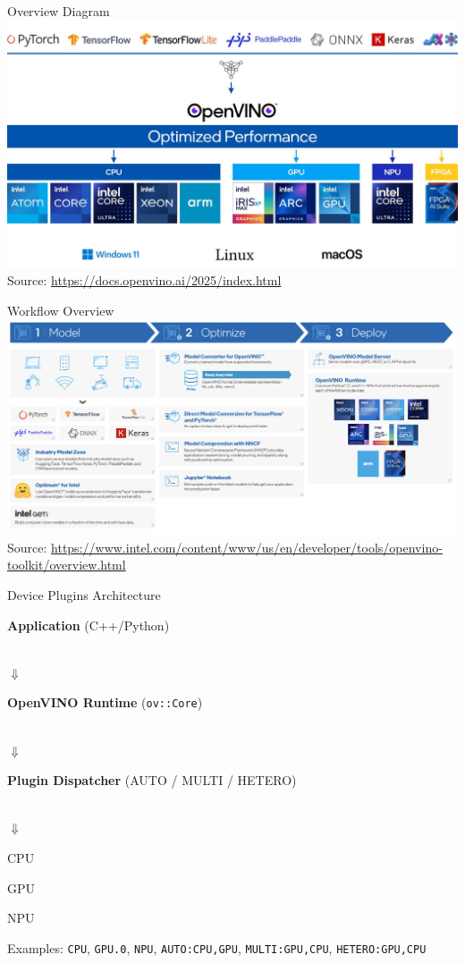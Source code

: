\documentclass{beamer}
\newcommand{\ovbox}[2]{\colorbox{#1}{\strut\parbox[c][1.2em]{0.6\linewidth}{\centering #2}}}
\newcommand{\ovpbox}[2]{\colorbox{#1}{\strut\parbox[c][1.2em]{0.15\linewidth}{\centering #2}}}
\begin{document}
\begin{frame}{Overview Diagram}
  \centering
  \includegraphics[width=\textwidth]{openvino-overview-diagram.jpg}
  \footnotesize Source: \href{https://docs.openvino.ai/2025/_images/openvino-overview-diagram.jpg}{https://docs.openvino.ai/2025/index.html}
\end{frame}

\begin{frame}{Workflow Overview}
  \centering
  \includegraphics[width=\textwidth]{openvino-use-case.png}
  \footnotesize Source: \href{https://www.intel.com/content/www/us/en/developer/tools/openvino-toolkit/overview.html}{https://www.intel.com/content/www/us/en/developer/tools/openvino-toolkit/overview.html}
\end{frame}

\begin{frame}{Device Plugins Architecture}
  \centering
  \ovbox{gray!15}{\textbf{Application} (C++/Python)}\\[0.6em]
  $\Downarrow$\\[0.2em]
  \ovbox{gray!15}{\textbf{OpenVINO Runtime} (\texttt{ov::Core})}\\[0.6em]
  $\Downarrow$\\[0.2em]
  \ovbox{blue!10}{\textbf{Plugin Dispatcher} (AUTO / MULTI / HETERO)}\\[0.8em]
  $\Downarrow$\\[0.6em]

  \ovpbox{gray!20}{CPU}\hspace{0.6em}%
  \ovpbox{green!15}{GPU}\hspace{0.6em}%
  \ovpbox{magenta!15}{NPU}%

  \vspace{0.6em}
  \footnotesize Examples: \texttt{CPU}, \texttt{GPU.0}, \texttt{NPU}, \texttt{AUTO:CPU,GPU}, \texttt{MULTI:GPU,CPU}, \texttt{HETERO:GPU,CPU}
\end{frame}
\end{document}
